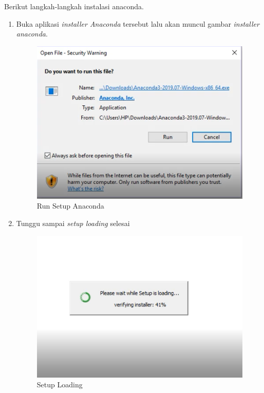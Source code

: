 Berikut langkah-langkah instalasi anaconda.
\begin{enumerate}
\item Buka aplikasi \textit{installer Anaconda} tersebut lalu akan muncul  gambar \textit{installer anaconda}.
\begin{figure}[H]
        \centerline{\includegraphics[scale=0.5]{figures/1}}
        \caption{Run Setup Anaconda}
		\label{langkah1}
\end{figure}

\item Tunggu sampai \textit{setup loading} selesai
\begin{figure}[H]
        \centerline{\includegraphics[scale=0.5]{figures/2}}
        \caption{Setup Loading}
		\label{langkah2}
\end{figure}



\end{enumerate}

